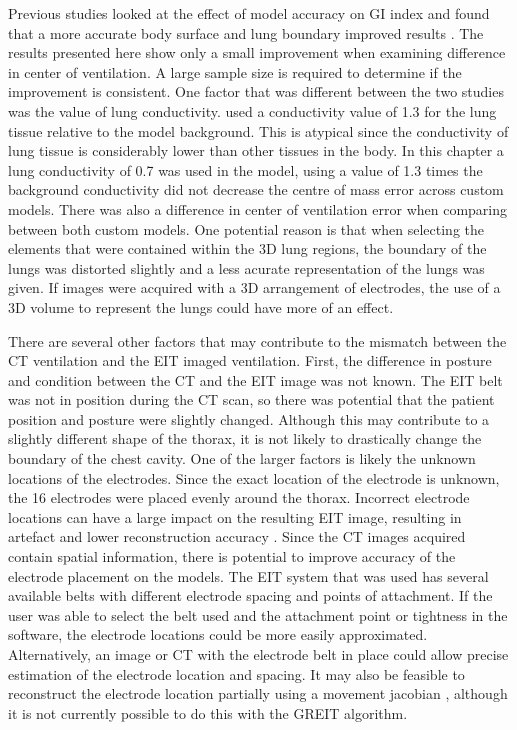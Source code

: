 Previous studies looked at the effect of model accuracy on GI index and found that a more 
accurate body surface and lung boundary improved results \parencite{yang_lung_2021}. 
The results presented here show only a small improvement when examining difference in  center
of ventilation. A large sample size is required to determine if the improvement is consistent.
One factor that was different between the two studies was the value 
of lung conductivity.  used a conductivity value of 1.3 for the lung 
tissue relative to the model background. This is atypical since the conductivity of lung tissue is 
considerably lower than other tissues in the body. In this chapter a lung conductivity of 0.7 was 
used in the model, using a value of 
1.3 times the background 
conductivity did not decrease the centre of mass error across custom models.
There was also a difference in center of ventilation error when comparing 
between both custom models. One potential reason is that when selecting the elements that were
contained within the 3D lung regions, the boundary of the lungs was distorted slightly and a less acurate
representation of the lungs was given. 
If images were acquired with a 3D arrangement of electrodes, the use of a 3D volume to represent the lungs 
could have more of an effect.

There are several other factors that may contribute to the mismatch between the 
CT ventilation and the EIT imaged ventilation. 
First, the difference in posture and condition between the CT and the EIT image 
was not known. The EIT belt was not in position during the CT scan, so  there was potential that the
patient position and posture were slightly changed. Although this may contribute to a slightly different
shape of the thorax, it is not likely to drastically change the boundary of the chest cavity. 
One of the larger factors is likely the unknown locations of the electrodes. Since the exact location 
of the electrode is unknown, the 16 electrodes were placed evenly around the thorax. 
Incorrect electrode locations can have a large impact on the resulting EIT
image, resulting in artefact and lower reconstruction accuracy \parencite{boyle_impact_2011}.
Since the CT images acquired 
contain spatial information, there is potential to improve accuracy of the 
electrode placement on the models. The EIT system that was used has several available belts with 
different electrode spacing and points of attachment. If the user was able to select 
the belt used and the attachment point or tightness in the software, 
the electrode locations could be more easily 
approximated. Alternatively, an image or CT with the electrode belt in place could allow
precise estimation of the electrode location and spacing. It may also 
be feasible to reconstruct the electrode location partially using a movement jacobian 
\parencite{soleimani_imaging_2006}, although it is not currently possible to do this 
with the GREIT algorithm. 

